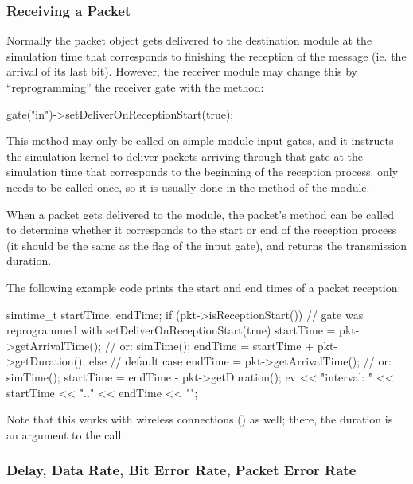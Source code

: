\subsubsection{Receiving a Packet}

Normally the packet object gets delivered to the destination module
at the simulation time that corresponds to finishing the reception
of the message (ie. the arrival of its last bit). However, the receiver
module may change this by ``reprogramming'' the receiver gate with
the  method:

\begin{cpp}
gate("in")->setDeliverOnReceptionStart(true);
\end{cpp}

This method may only be called on simple module input gates, and it
instructs the simulation kernel to deliver packets arriving through
that gate at the simulation time that corresponds to the
beginning of the reception process.
 only needs to be called once,
so it is usually done in the  method of the module.

When a packet gets delivered to the module, the packet's
 method can be called to determine
whether it corresponds to the start or end of the reception
process (it should be the same as the 
flag of the input gate), and  returns the transmission
duration.

The following example code prints the start and end times of a packet reception:

\begin{cpp}
simtime_t startTime, endTime;
if (pkt->isReceptionStart())
{
    // gate was reprogrammed with setDeliverOnReceptionStart(true)
    startTime = pkt->getArrivalTime(); // or: simTime();
    endTime = startTime + pkt->getDuration();
}
else
{
    // default case
    endTime = pkt->getArrivalTime(); // or: simTime();
    startTime = endTime - pkt->getDuration();
}
ev << "interval: " << startTime << ".." << endTime << "\n";
\end{cpp}

Note that this works with wireless connections ()
as well; there, the duration is an argument to the 
call.


\subsubsection{Delay, Data Rate, Bit Error Rate, Packet Error Rate}

